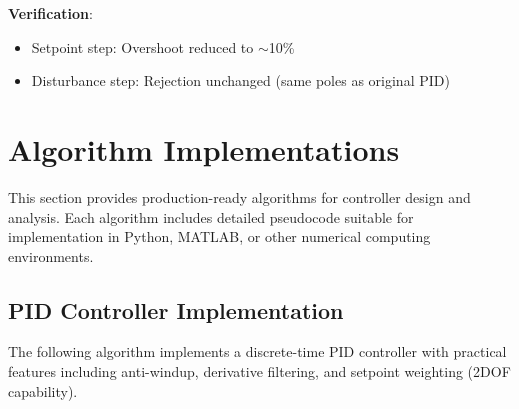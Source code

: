 \textbf{Verification}:
\begin{itemize}
    \item Setpoint step: Overshoot reduced to $\sim$10\%
    \item Disturbance step: Rejection unchanged (same poles as original PID)
\end{itemize}

\section{Algorithm Implementations}
\label{sec:algorithms}

This section provides production-ready algorithms for controller design and analysis. Each algorithm includes detailed pseudocode suitable for implementation in Python, MATLAB, or other numerical computing environments.

\subsection{PID Controller Implementation}
\label{subsec:pid_algorithm}

The following algorithm implements a discrete-time PID controller with practical features including anti-windup, derivative filtering, and setpoint weighting (2DOF capability).

